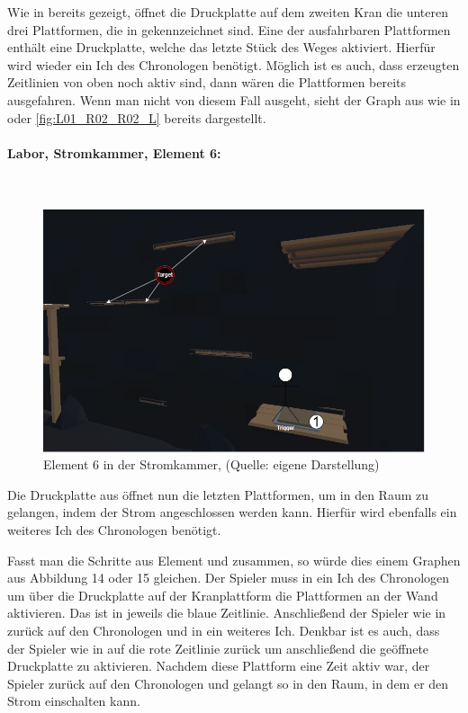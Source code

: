 Wie in  bereits gezeigt, öffnet die Druckplatte auf dem zweiten Kran die unteren drei Plattformen, die in  gekennzeichnet sind. Eine der ausfahrbaren Plattformen enthält eine Druckplatte, welche das letzte Stück des Weges aktiviert. Hierfür wird wieder ein Ich des Chronologen benötigt. Möglich ist es auch, dass erzeugten Zeitlinien von oben noch aktiv sind, dann wären die Plattformen bereits ausgefahren. Wenn man nicht von diesem Fall ausgeht, sieht der Graph aus wie in  oder \ref{fig:L01_R02_R02_L} bereits dargestellt.
\newpage
\paragraph{Labor, Stromkammer, Element 6:}\label{p:lse6}
~
\begin{figure}[ht]
\centering
\includegraphics[width=0.8\linewidth]{content/pictures/Raetsel-L02_R01_R06.jpg}
\caption{Element 6 in der Stromkammer, (Quelle: eigene Darstellung)}
\label{fig:L02_R01_R06}
\end{figure}

Die Druckplatte aus  öffnet nun die letzten Plattformen, um in den Raum zu gelangen, indem der Strom angeschlossen werden kann. Hierfür wird ebenfalls ein weiteres Ich des Chronologen benötigt.

Fasst man die Schritte aus Element  und  zusammen, so würde dies einem Graphen aus Abbildung 14 oder 15 gleichen. Der Spieler muss in ein Ich des Chronologen  um über die Druckplatte auf der Kranplattform die Plattformen an der Wand aktivieren. Das ist in  jeweils die blaue Zeitlinie. Anschließend  der Spieler wie in  zurück auf den Chronologen und  in ein weiteres Ich. Denkbar ist es auch, dass der Spieler wie in  auf die rote Zeitlinie zurück  um anschließend die geöffnete Druckplatte zu aktivieren. Nachdem diese Plattform eine Zeit aktiv war,  der Spieler zurück auf den Chronologen und gelangt so in den Raum, in dem er den Strom einschalten kann.
\newpage
